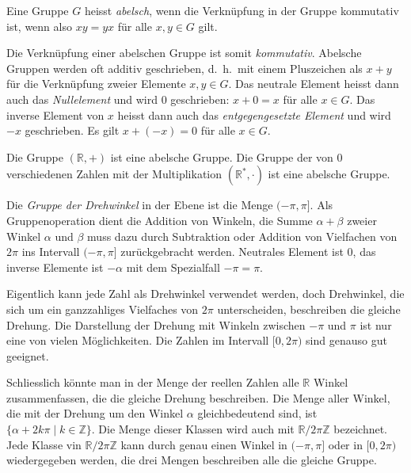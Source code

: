 \begin{definition}
\label{buch:gruppen:definition:abelsch}
Eine Gruppe $G$ heisst {\em abelsch}, wenn 
die Verknüpfung in der Gruppe kommutativ ist, wenn also
$xy=yx$ für alle $x,y\in G$ gilt.
\end{definition}

Die Verknüpfung einer abelschen Gruppe ist somit {\em kommutativ}.
%
Abelsche Gruppen werden oft additiv geschrieben, d.~h.~mit einem
Pluszeichen als $x+y$ für die Verknüpfung zweier Elemente $x,y\in G$.
Das neutrale Element heisst dann auch das {\em Nullelement} und wird $0$
geschrieben: $x+0=x$ für alle $x\in G$.
Das inverse Element von $x$ heisst dann auch das
{\em entgegengesetzte Element} und wird $-x$ geschrieben. 
Es gilt $x+(-x)=0$ für alle $x\in G$.

\begin{beispiel}
Die Gruppe $(\mathbb{R},+)$ ist eine abelsche Gruppe.
Die Gruppe der von $0$ verschiedenen Zahlen mit der Multiplikation
$(\mathbb{R}^*,\cdot)$ ist eine abelsche Gruppe.
\end{beispiel}

\begin{beispiel}
Die {\em Gruppe der Drehwinkel} in der Ebene ist die Menge
$
(-\pi,\pi]
$.
Als Gruppenoperation dient die Addition von Winkeln, die Summe
$\alpha+\beta$ zweier Winkel $\alpha$ und $\beta$ muss dazu durch
Subtraktion oder Addition von Vielfachen von $2\pi$ ins Intervall
$(-\pi,\pi]$ zurückgebracht werden.
Neutrales Element ist $0$, das inverse Elemente ist $-\alpha$ mit
dem Spezialfall $-\pi=\pi$.

Eigentlich kann jede Zahl als Drehwinkel verwendet werden, doch
Drehwinkel, die sich um ein ganzzahliges Vielfaches von $2\pi$ unterscheiden,
beschreiben die gleiche Drehung.
Die Darstellung der Drehung mit Winkeln zwischen $-\pi$ und $\pi$ ist nur
eine von vielen Möglichkeiten.
Die Zahlen im Intervall $[0,2\pi)$ sind genauso gut geeignet.

Schliesslich könnte man in der Menge der reellen Zahlen alle
$\mathbb{R}$ Winkel zusammenfassen, die die gleiche Drehung beschreiben.
Die Menge aller Winkel, die mit der Drehung um den Winkel $\alpha$
gleichbedeutend sind, ist $\{\alpha + 2k\pi\mid k\in\mathbb{Z}\}$.
Die Menge dieser Klassen wird auch mit $\mathbb{R}/2\pi\mathbb{Z}$
bezeichnet.
Jede Klasse vin $\mathbb{R}/2\pi\mathbb{Z}$ kann durch genau einen
Winkel in $(-\pi,\pi]$ oder in $[0,2\pi)$ wiedergegeben werden,
die drei Mengen beschreiben alle die gleiche Gruppe.
\end{beispiel}

